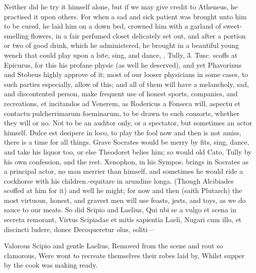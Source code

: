 {Neither did he try it himself alone, but if we may give credit to
Atheneus, he practised it upon others. For when a sad and sick
patient was brought unto him to be cured, he laid him on a down bed,
crowned him with a garland of sweet-smelling flowers, in a fair
perfumed closet delicately set out, and after a portion or two of good
drink, which he administered, he brought in a beautiful young
wench that could play upon a lute, sing, and dance, \etc{}. Tully, 3.
Tusc. scoffs at Epicurus, for this his profane physic (as well he
deserved), and yet Phavorinus and Stobeus highly approve of it; most of
our looser physicians in some cases, to such parties especially, allow
of this; and all of them will have a melancholy, sad, and discontented
person, make frequent use of honest sports, companies, and recreations,
et incitandos ad Venerem, as Rodericus a Fonseca will, aspectu et
contactu pulcherrimarum foeminarum, to be drawn to such consorts,
whether they will or no. Not to be an auditor only, or a spectator, but
sometimes an actor himself. Dulce est desipere in loco, to play the
fool now and then is not amiss, there is a time for all things. Grave
Socrates would be merry by fits, sing, dance, and take his liquor too,
or else Theodoret belies him; so would old Cato, Tully by his own
confession, and the rest. Xenophon, in his Sympos. brings in Socrates
as a principal actor, no man merrier than himself, and sometimes he
would ride a cockhorse with his children.-equitare in arundine
longa. (Though Alcibiades scoffed at him for it) and well he might; for
now and then (saith Plutarch) the most virtuous, honest, and gravest
men will use feasts, jests, and toys, as we do sauce to our meats. So
did Scipio and Laelius,
Qui ubi se a vulgo et scena in secreta remorant,
Virtus Scipiadae et mitis sapientia Laeli,
Nugari cum illo, et discincti ludere, donec
Decoqueretur olus, soliti---

Valorous Scipio and gentle Laelius,
Removed from the scene and rout so clamorous,
Were wont to recreate themselves their robes laid by,
Whilst supper by the cook was making ready.

}
